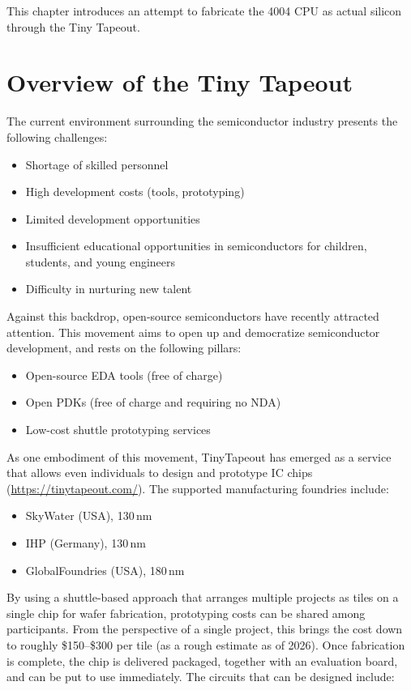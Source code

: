 This chapter introduces an attempt to fabricate the 4004 CPU as actual silicon through the Tiny Tapeout.

\section{Overview of the Tiny Tapeout}
The current environment surrounding the semiconductor industry presents the following challenges:

\begin{itemize}
  \item Shortage of skilled personnel
  \item High development costs (tools, prototyping)
  \item Limited development opportunities
  \item Insufficient educational opportunities in semiconductors for children, students, and young engineers
  \item Difficulty in nurturing new talent
\end{itemize}

Against this backdrop, open-source semiconductors have recently attracted attention. This movement aims to open up and democratize semiconductor development, and rests on the following pillars:

\begin{itemize}
  \item Open-source EDA tools (free of charge)
  \item Open PDKs (free of charge and requiring no NDA)
  \item Low-cost shuttle prototyping services
\end{itemize}

As one embodiment of this movement, TinyTapeout has emerged as a service that allows even individuals to design and prototype IC chips (\url{https://tinytapeout.com/}). The supported manufacturing foundries include:

\begin{itemize}
  \item SkyWater (USA), 130\,nm
  \item IHP (Germany), 130\,nm
  \item GlobalFoundries (USA), 180\,nm
\end{itemize}

By using a shuttle-based approach that arranges multiple projects as tiles on a single chip for wafer fabrication, prototyping costs can be shared among participants. From the perspective of a single project, this brings the cost down to roughly \$150--\$300 per tile (as a rough estimate as of 2026). Once fabrication is complete, the chip is delivered packaged, together with an evaluation board, and can be put to use immediately. The circuits that can be designed include:

